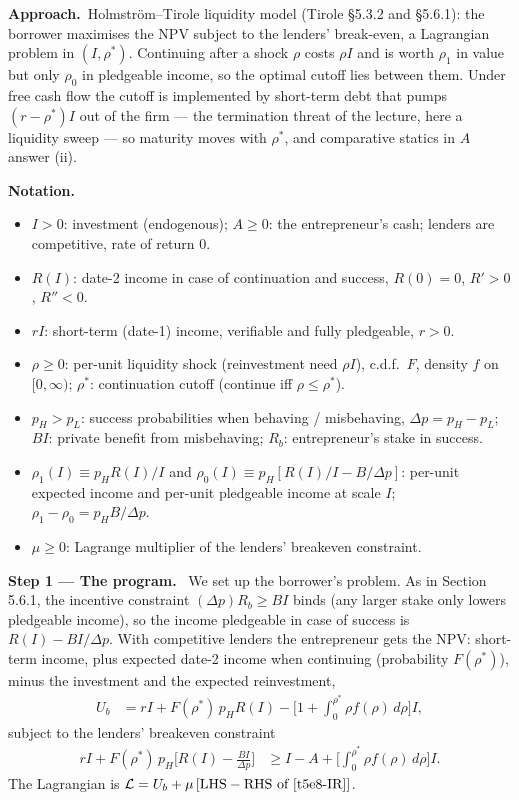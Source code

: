 \documentclass[11pt,a4paper]{article}
\newcommand{\notation}{\par\noindent\textbf{Notation.}}
\newcommand{\step}[2]{\par\medskip\noindent\textbf{Step #1 --- #2.}~}
\newcommand{\approach}{\par\smallskip\noindent\textbf{Approach.}~}
\begin{document}
\approach Holmstr\"om--Tirole liquidity model (Tirole \S5.3.2 and \S5.6.1): the borrower maximises the
NPV subject to the lenders' break-even, a Lagrangian problem in $(I,\rho^*)$. Continuing after a shock
$\rho$ costs $\rho I$ and is worth $\rho_1$ in value but only $\rho_0$ in pledgeable income, so the
optimal cutoff lies between them. Under free cash flow the cutoff is implemented by short-term debt that
pumps $(r-\rho^*)I$ out of the firm --- the termination threat of the lecture, here a liquidity sweep ---
so maturity moves with $\rho^*$, and comparative statics in $A$ answer (ii).

\notation
\begin{itemize}
  \item $I>0$: investment (endogenous); $A\ge 0$: the entrepreneur's cash; lenders are competitive, rate of return 0.
  \item $R(I)$: date-2 income in case of continuation and success, $R(0)=0$, $R'>0$, $R''<0$.
  \item $rI$: short-term (date-1) income, verifiable and fully pledgeable, $r>0$.
  \item $\rho\ge 0$: per-unit liquidity shock (reinvestment need $\rho I$), c.d.f.\ $F$, density $f$ on $[0,\infty)$; $\rho^*$: continuation cutoff (continue iff $\rho\le\rho^*$).
  \item $p_H>p_L$: success probabilities when behaving / misbehaving, $\Delta p=p_H-p_L$; $BI$: private benefit from misbehaving; $R_b$: entrepreneur's stake in success.
  \item $\rho_1(I)\equiv p_H R(I)/I$ and $\rho_0(I)\equiv p_H[R(I)/I-B/\Delta p]$: per-unit expected income and per-unit pledgeable income at scale $I$; $\rho_1-\rho_0=p_HB/\Delta p$.
  \item $\mu\ge 0$: Lagrange multiplier of the lenders' breakeven constraint.
\end{itemize}

\step{1}{The program} We set up the borrower's problem. As in Section 5.6.1, the incentive constraint
$(\Delta p)R_b\ge BI$ binds (any larger stake only lowers pledgeable income), so the income pledgeable in
case of success is $R(I)-BI/\Delta p$. With competitive lenders the entrepreneur gets the NPV: short-term
income, plus expected date-2 income when continuing (probability $F(\rho^*)$), minus the investment and the
expected reinvestment,
\begin{align}
  U_b &= rI + F(\rho^*)\,p_H R(I) - \Big[1+\int_0^{\rho^*}\rho f(\rho)\,d\rho\Big] I, \label{t5e8-Ub}
\end{align}
subject to the lenders' breakeven constraint
\begin{align}
  rI + F(\rho^*)\,p_H\Big[R(I)-\frac{BI}{\Delta p}\Big] &\ge I - A + \Big[\int_0^{\rho^*}\rho f(\rho)\,d\rho\Big] I. \label{t5e8-IR}
\end{align}
The Lagrangian is $\mathcal L = U_b + \mu\,[\text{LHS}-\text{RHS of }\eqref{t5e8-IR}]$.
\end{document}
